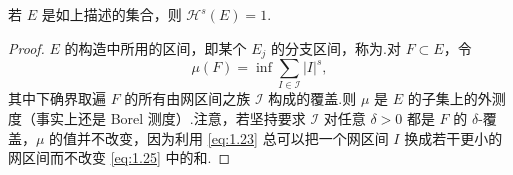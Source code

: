 \begin{theorem}\label{thm:1.15}
若 $E$ 是如上描述的集合，则 $\mathcal{H}^s(E)=1$.
\end{theorem}

\begin{proof}
$E$ 的构造中所用的区间，即某个 $E_j$ 的分支区间，称为.对 $F\subset E$，令
\begin{equation}\label{eq:1.25}
  \mu(F)=\inf\sum_{I\in\mathcal{I}}|I|^{s},
\end{equation}
其中下确界取遍 $F$ 的所有由网区间之族 $\mathcal{I}$ 构成的覆盖.则 $\mu$ 是 $E$ 的子集上的外测度（事实上还是 Borel 测度）.注意，若坚持要求 $\mathcal{I}$ 对任意 $\delta>0$ 都是 $F$ 的 $\delta$-覆盖，$\mu$ 的值并不改变，因为利用 \eqref{eq:1.23} 总可以把一个网区间 $I$ 换成若干更小的网区间而不改变 \eqref{eq:1.25} 中的和.


\end{proof}
